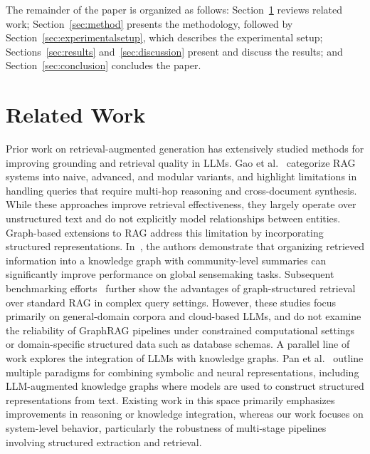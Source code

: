 \documentclass{article}
\begin{document}
The remainder of the paper is organized as follows: Section~\ref{sec:relatedwork} reviews related work; Section~\ref{sec:method} presents the methodology, followed by Section~\ref{sec:experimentalsetup}, which describes the experimental setup; Sections~\ref{sec:results} and~\ref{sec:discussion} present and discuss the results; and Section~\ref{sec:conclusion} concludes the paper.

\section{Related Work}
\label{sec:relatedwork}

Prior work on retrieval-augmented generation has extensively studied methods for improving grounding and retrieval quality in LLMs. Gao et al.~\cite{gao2023retrieval} categorize RAG systems into naive, advanced, and modular variants, and highlight limitations in handling queries that require multi-hop reasoning and cross-document synthesis. While these approaches improve retrieval effectiveness, they largely operate over unstructured text and do not explicitly model relationships between entities. Graph-based extensions to RAG address this limitation by incorporating structured representations. In~\cite{edge2024local}, the authors demonstrate that organizing retrieved information into a knowledge graph with community-level summaries can significantly improve performance on global sensemaking tasks. Subsequent benchmarking efforts~\cite{cai2025mollangbench,han2025rag} further show the advantages of graph-structured retrieval over standard RAG in complex query settings. However, these studies focus primarily on general-domain corpora and cloud-based LLMs, and do not examine the reliability of GraphRAG pipelines under constrained computational settings or domain-specific structured data such as database schemas. A parallel line of work explores the integration of LLMs with knowledge graphs. Pan et al.~\cite{pan2024unifying} outline multiple paradigms for combining symbolic and neural representations, including LLM-augmented knowledge graphs where models are used to construct structured representations from text. Existing work in this space primarily emphasizes improvements in reasoning or knowledge integration, whereas our work focuses on system-level behavior, particularly the robustness of multi-stage pipelines involving structured extraction and retrieval.
\end{document}
